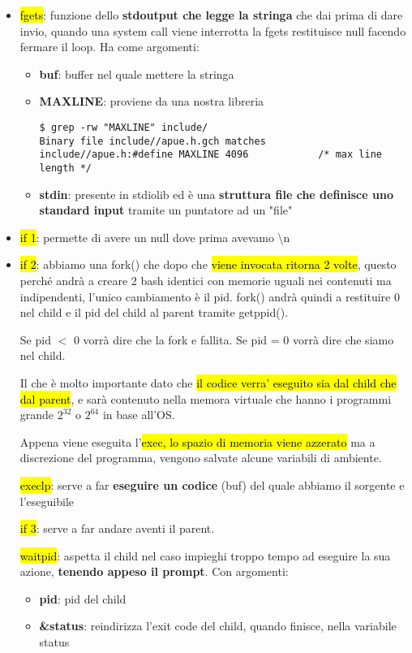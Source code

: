 \begin{itemize}
	\item \hl{fgets}: funzione dello \textbf{stdoutput che legge la stringa} che dai prima di dare invio, quando una system call viene interrotta la fgets restituisce null facendo fermare il loop. Ha come argomenti:
	
		\begin{itemize}
			\item \textbf{buf}: buffer nel quale mettere la stringa
		
			\item \textbf{MAXLINE}: proviene da una nostra libreria

\begin{lstlisting}
$ grep -rw "MAXLINE" include/
Binary file include//apue.h.gch matches
include//apue.h:#define	MAXLINE	4096			/* max line length */
\end{lstlisting}

			\item \textbf{stdin}: presente in stdiolib ed è una \textbf{struttura file che definisce uno standard input} tramite un puntatore ad un "file"
		\end{itemize}

	\item \hl{if 1}: permette di avere un null dove prima avevamo \textbackslash n
	
	\item \hl{if 2}: abbiamo una fork() che dopo che \hl{viene invocata ritorna 2 volte}, questo perché andrà a creare 2 bash identici con memorie uguali nei contenuti ma indipendenti, l'unico cambiamento è il pid. fork() andrà quindi a restituire 0 nel child e il pid del child al parent tramite getppid().

			Se pid $<$ 0 vorrà dire che la fork e fallita.
			Se pid = 0 vorrà dire che siamo nel child.
	
			Il che è molto importante dato che \hl{il codice verra' eseguito sia dal child che dal parent}, e sarà contenuto nella memora virtuale che hanno i programmi grande $2^{32}$ o $2^{64}$ in base all'OS.
	
			Appena viene eseguita l'\hl{exec, lo spazio di memoria viene azzerato} ma a discrezione del programma, vengono salvate alcune variabili di ambiente.


		\hl{execlp}: serve a far \textbf{eseguire un codice} (buf) del quale abbiamo il sorgente e l'eseguibile
	

		\hl{if 3}: serve a far andare aventi il parent.

		\hl{waitpid}: aspetta il child nel caso impieghi troppo tempo ad eseguire la sua azione, \textbf{tenendo appeso il prompt}. Con argomenti:

			\begin{itemize}
				\item \textbf{pid}: pid del child
				\item \textbf{\&status}: reindirizza l'exit code del child, quando finisce, nella variabile status
			\end{itemize}
			
\end{itemize}


